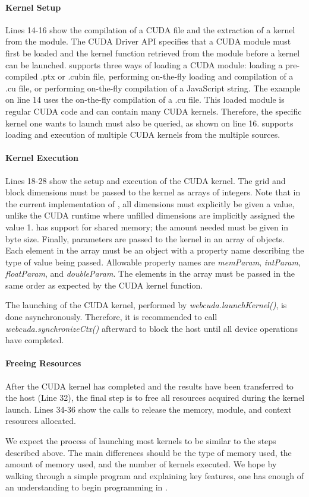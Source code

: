 \paragraph{Kernel Setup} Lines 14-16 show the compilation of a CUDA file and the
extraction of a kernel from the module. The CUDA Driver API specifies that a
CUDA module must first be loaded and the kernel function retrieved from the
module before a kernel can be launched. \name supports three ways of loading a
CUDA module: loading a pre-compiled .ptx or .cubin file, performing on-the-fly
loading and compilation of a .cu file, or performing on-the-fly compilation of a
JavaScript string.  The example on line 14 uses the on-the-fly compilation of a
.cu file. This loaded module is regular CUDA code and can contain many CUDA
kernels.  Therefore, the specific kernel one wants to launch must also be
queried, as shown on line 16. \name supports loading and execution of
multiple CUDA kernels from the multiple sources.

\paragraph{Kernel Execution} Lines 18-28 show the setup and execution of the
CUDA kernel. The grid and block dimensions must be passed to the kernel as
arrays of integers. Note that in the current implementation of \namens, all
dimensions must explicitly be given a value, unlike the CUDA runtime where
unfilled dimensions are implicitly assigned the value 1. \name has support for
shared memory; the amount needed must be given in byte size. Finally, parameters
are passed to the kernel in an array of objects. Each element in the array must
be an object with a property name describing the type of value being passed.
Allowable property names are \textit{memParam}, \textit{intParam},
\textit{floatParam}, and \textit{doubleParam}. The elements in the array must be
passed in the same order as expected by the CUDA kernel function.

The launching of the CUDA kernel, performed by \textit{webcuda.launchKernel()}, is
done asynchronously. Therefore, it is recommended to call
\textit{webcuda.synchronizeCtx()} afterward to block the host until all device operations
have completed.

\paragraph{Freeing Resources}
After the CUDA kernel has completed and the results have been transferred to the
host (Line 32), the final step is to free all resources acquired during the
kernel launch. Lines 34-36 show the \name calls to release the memory, module,
and context resources allocated.


We expect the process of launching most kernels to be similar to the steps
described above.  The main differences should be the type of memory used, the
amount of memory used, and the number of kernels executed. We hope by walking
through a simple program and explaining key \name features, one has enough of an
understanding to begin programming in \namens.

